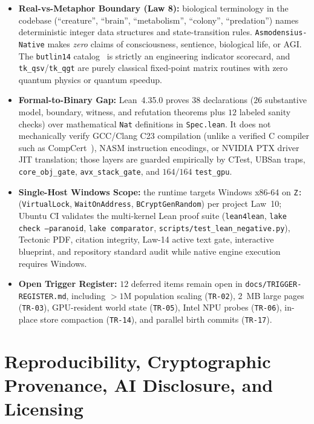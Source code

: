 \documentclass[11pt,reqno]{amsart}
\newcommand{\code}[1]{\texttt{\footnotesize #1}}
\newcommand{\us}{\_\allowbreak}
\newcommand{\slsh}{/\allowbreak}
\begin{document}
\begin{itemize}[leftmargin=1.8em,itemsep=2pt]
  \item \textbf{Real-vs-Metaphor Boundary (Law 8):} biological terminology in the codebase (``creature'', ``brain'', ``metabolism'', ``colony'', ``predation'') names deterministic integer data structures and state-transition rules. \code{Asmodensius-Native} makes \emph{zero} claims of consciousness, sentience, biological life, or AGI. The \code{butlin14} catalog~\cite{butlin2023consciousness} is strictly an engineering indicator scorecard, and \code{tk\us qsv}/\code{tk\us qgt} are purely classical fixed-point matrix routines with zero quantum physics or quantum speedup.
  \item \textbf{Formal-to-Binary Gap:} Lean~4.35.0 proves $38$ declarations ($26$ substantive model, boundary, witness, and refutation theorems plus $12$ labeled sanity checks) over mathematical \code{Nat} definitions in \code{Spec.lean}. It does not mechanically verify GCC/Clang C23 compilation (unlike a verified C compiler such as CompCert~\cite{leroy2009formal}), NASM instruction encodings, or NVIDIA PTX driver JIT translation; those layers are guarded empirically by CTest, UBSan traps, \code{core\us obj\us gate}, \code{avx\us stack\us gate}, and $164/164$ \code{test\us gpu}.
  \item \textbf{Single-Host Windows Scope:} the runtime targets Windows x86-64 on \code{Z:} (\code{VirtualLock}, \code{WaitOnAddress}, \code{BCryptGenRandom}) per project Law~10; Ubuntu CI validates the multi-kernel Lean proof suite (\code{lean4lean}, \code{lake check --paranoid}, \code{lake comparator}, \code{scripts\slsh test\us lean\us negative.py}), Tectonic PDF, citation integrity, Law-14 active text gate, interactive blueprint, and repository standard audit while native engine execution requires Windows.
  \item \textbf{Open Trigger Register:} $12$ deferred items remain open in \code{docs\slsh TRIGGER-REGISTER.md}, including $>1\text{M}$ population scaling (\code{TR-02}), 2~MB large pages (\code{TR-03}), GPU-resident world state (\code{TR-05}), Intel NPU probes (\code{TR-06}), in-place store compaction (\code{TR-14}), and parallel birth commits (\code{TR-17}).
\end{itemize}

\section{Reproducibility, Cryptographic Provenance, AI Disclosure, and Licensing}
\end{document}
